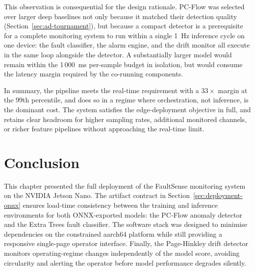 This observation is consequential for the design rationale. PC-Flow was selected over larger deep baselines not only because it matched their detection quality (Section~\ref{sec:ad-tournament}), but because a compact detector is a prerequisite for a complete monitoring system to run within a single 1~Hz inference cycle on one device: the fault classifier, the alarm engine, and the drift monitor all execute in the same loop alongside the detector. A substantially larger model would remain within the 1\,000~ms per-sample budget in isolation, but would consume the latency margin required by the co-running components.


In summary, the pipeline meets the real-time requirement with a $33\times$ margin at the 99th percentile, and does so in a regime where orchestration, not inference, is the dominant cost. The system satisfies the edge-deployment objective in full, and retains clear headroom for higher sampling rates, additional monitored channels, or richer feature pipelines without approaching the real-time limit.

\section{Conclusion}
\label{sec:deployment-conclusion}

This chapter presented the full deployment of the FaultSense monitoring system on the NVIDIA Jetson Nano. The artifact contract in Section~\ref{sec:deployment-onnx} ensures load-time consistency between the training and inference environments for both ONNX-exported models: the PC-Flow anomaly detector and the Extra Trees fault classifier. The software stack was designed to minimise dependencies on the constrained aarch64 platform while still providing a responsive single-page operator interface. Finally, the Page-Hinkley drift detector monitors operating-regime changes independently of the model score, avoiding circularity and alerting the operator before model performance degrades silently.